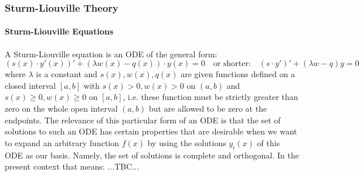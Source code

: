 




\subsubsection{Sturm-Liouville Theory}

\paragraph{Sturm-Liouville Equations}
A Sturm-Liouville equation is an ODE of the general form:
\begin{equation}
(s(x) \cdot y'(x))' + (\lambda w(x) - q(x)) \cdot y(x) = 0
\quad \text{or shorter:} \quad
(s \cdot y')' + (\lambda w - q) y = 0
\end{equation}
where $\lambda$ is a constant and $s(x),w(x),q(x)$ are given functions defined on a closed interval $[a,b]$ with $s(x) > 0, w(x) > 0$ on $(a,b)$ and $s(x) \geq 0, w(x) \geq 0$ on $[a,b]$, i.e. these function must be strictly greater than zero on the whole open interval $(a,b)$ but are allowed to be zero at the endpoints. The relevance of this particular form of an ODE is that the set of solutions to such an ODE has certain properties that are desirable when we want to expand an arbitrary function $f(x)$ by using the solutions $y_i(x)$ of this ODE as our basis. Namely, the set of solutions is complete and orthogonal. In the present context that means: ...TBC...

